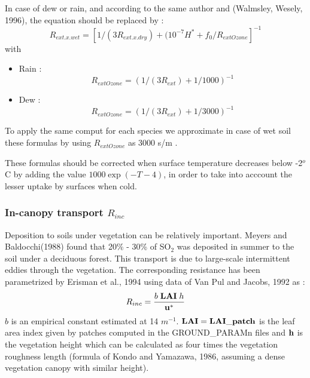 In case of dew or rain, and according to the same author and
(Walmsley, Wesely, 1996), the equation should be replaced by :
\[R_{ext.x.wet}=[1/(3R_{ext.x.dry})+(10^{-7}H^*+f_0/R_{extOzone}]^{-1}\]
with

\begin{itemize}
 
\item { Rain : \[ R_{extOzone} = (1/(3R_{ext})+1/1000 )^{-1}\]  }
 
\item { Dew : \[ R_{extOzone} = (1/(3R_{ext})+1/3000 )^{-1}\]  }
\end{itemize}
 
To apply the same comput for each species we approximate in case of
wet soil these formulas by 
using $R_{extOzone}$ as 3000 s/m .

These formulas should be corrected when surface
temperature decreases below -2$^o$C by adding the value
$1000 \exp (-T-4)$, in order to take into acccount the lesser uptake
by surfaces 
when cold.
\subsubsection{In-canopy transport $R_{inc}$}

Deposition to soils under vegetation can be relatively important. Meyers and
Baldocchi(1988) found that 20\% - 30\% of SO$_2$ was deposited 
in summer to the soil under a deciduous forest.
This transport is due to large-scale intermittent eddies through the
vegetation. 
The corresponding resistance has been parametrized by Erisman et al., 1994 
using data of Van Pul and Jacobs, 1992
as :
\[ R_{inc}=\frac{b\; {\bf LAI}\; h}{\bf{u^*}}\]        %
$b$ is an empirical constant estimated at 14 $m^{-1}$. $\bf LAI=
LAI\_patch$ is the  
leaf area index given by patches computed in the GROUND\_PARAMn files
and $\bf h$ is the 
vegetation height which can be calculated as four times the 
vegetation roughness length
(formula of Kondo and Yamazawa, 1986, assuming a dense vegetation canopy
with similar height).

\medskip
